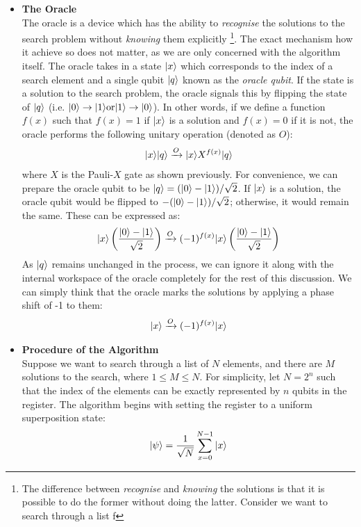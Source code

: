 \documentclass[bibliography=totocnumbered, 10pt]{article}
\theoremstyle{NoticeStyle}
\begin{document}
\begin{itemize}
\item[] \textbf{The Oracle}\\
The oracle is a device which has the ability to \emph{recognise} the solutions to the search problem without \emph{knowing} them explicitly \footnote{The difference between \emph{recognise} and \emph{knowing} the solutions is that it is possible to do the former without doing the latter. Consider we want to search through a list f}. The exact mechanism how it achieve so does not matter, as we are only concerned with the algorithm itself. The oracle takes in a state ${\left\vert{x}\right\rangle}$ which corresponds to the index of a search element and a single qubit ${\left\vert{q}\right\rangle}$ known as the \emph{oracle qubit}. If the state is a solution to the search problem, the oracle signals this by flipping the state of ${\left\vert{q}\right\rangle}$ (i.e. ${\left\vert{0}\right\rangle} \rightarrow {\left\vert{1}\right\rangle} \textrm{or} {\left\vert{1}\right\rangle} \rightarrow {\left\vert{0}\right\rangle}$). In other words, if we define a function $f(x)$ such that $f(x) = 1$ if ${\left\vert{x}\right\rangle}$ is a solution and $f(x) = 0$ if it is not, the oracle performs the following unitary operation (denoted as $O$):
\begin{align}
	{\left\vert{x}\right\rangle} {\left\vert{q}\right\rangle} \xrightarrow{O} {\left\vert{x}\right\rangle} X^{f(x)} {\left\vert{q}\right\rangle}
\end{align}
where $X$ is the Pauli-$X$ gate as shown previously. For convenience, we can prepare the oracle qubit to be ${\left\vert{q}\right\rangle} = ({\left\vert{0}\right\rangle} - {\left\vert{1}\right\rangle}) / \sqrt{2}$. If ${\left\vert{x}\right\rangle}$ is a solution, the oracle qubit would be flipped to $- ({\left\vert{0}\right\rangle} - {\left\vert{1}\right\rangle}) / \sqrt{2}$; otherwise, it would remain the same. These can be expressed as:
\begin{align}
	{\left\vert{x}\right\rangle} \left(\frac{{\left\vert{0}\right\rangle} - {\left\vert{1}\right\rangle}}{\sqrt{2}}\right) \xrightarrow{O} (-1)^{f(x)}{\left\vert{x}\right\rangle}\left(\frac{{\left\vert{0}\right\rangle} - {\left\vert{1}\right\rangle}}{\sqrt{2}}\right)
\end{align}
As ${\left\vert{q}\right\rangle}$ remains unchanged in the process, we can ignore it along with the internal workspace of the oracle completely for the rest of this discussion. We can simply think that the oracle marks the solutions by applying a phase shift of -1 to them:
\begin{align}
	{\left\vert{x}\right\rangle} \xrightarrow{O} (-1)^{f(x)}{\left\vert{x}\right\rangle} 
\end{align}

\item[] \textbf{Procedure of the Algorithm}\\
Suppose we want to search through a list of $N$ elements, and there are $M$ solutions to the search, where $ 1 \leq M \leq N$. For simplicity, let $N = 2^n$ such that the index of the elements can be exactly represented by $n$ qubits in the register. The algorithm begins with setting the register to a uniform superposition state:
\begin{align}
	{\left\vert{\psi}\right\rangle} = \frac{1}{\sqrt{N}} \sum_{x=0}^{N-1} {\left\vert{x}\right\rangle}
\end{align}


\end{itemize}
\end{document}
